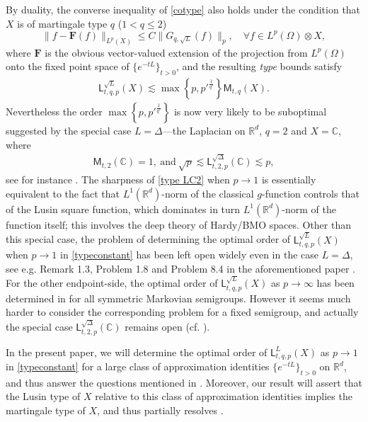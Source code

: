 \documentclass[oneside,english,a4wide]{amsart}
\numberwithin{equation}{section}
\numberwithin{figure}{section}
\theoremstyle{plain}
\theoremstyle{plain}
\theoremstyle{definition}
\theoremstyle{plain}
\theoremstyle{remark}
\theoremstyle{definition}
\theoremstyle{remark}
\theoremstyle{definition}
\newcommand{\8}{+\infty}
\renewcommand{\1}{\mathbbm{1}}
\newcommand\lk[1]{ \left\{ #1 \right\} }
\begin{document}
By duality, the converse inequality of \eqref{cotype} also holds under the condition that $X$ is of  {martingale type} $q$ ($1<q \leq2$)
$$\|f-\mathbf{F}(f) \|_{L^p(X)}\leq C\|G_{q,\sqrt{L}}(f)\|_{p},\quad\forall f\in L^p(\Omega)\otimes X,$$
where $ \mathbf{F} $ is the obvious vector-valued extension of the projection from $L^p(\Omega)$ onto the fixed point space of $\{e^{-tL}\}_{t > 0}$, and the resulting {\it type} bounds satisfy
\begin{align}\label{typeconstant}
\mathsf{L}^{\sqrt{L}}_{t,q, p}(X) \lesssim \max\lk{ p, p'^{\frac{1}{q'}} }\mathsf{M}_{t, q}(X).
\end{align}
Nevertheless the order $\max\lk{ p, p'^{\frac{1}{q'}}}$ is now very likely to be suboptimal suggested by the special case $L=\Delta$---the Laplacian on $\mathbb R^d$, $q=2$ and $X=\mathbb C$,  where 
\begin{align}\label{type LC2}\mathsf{M}_{t, 2}(\mathbb C)=1, \ \mathrm{and}\ \sqrt{p}\lesssim \mathsf{L}^{\sqrt{\Delta}}_{t,2, p}(\mathbb C) \lesssim p, \end{align}
see for instance \cite[Theorem 1]{Xu2022}. The sharpness of \eqref{type LC2} when $p\rightarrow 1$ is essentially equivalent to the fact that $L^1(\mathbb R^d)$-norm of the classical $g$-function controls that of the Lusin square function, which dominates in turn $L^1(\mathbb R^d)$-norm of the function itself; this involves the deep theory of Hardy/BMO spaces. Other than this special case, the problem of determining the optimal order of $\mathsf{L}^{\sqrt{L}}_{t, q, p}(X)$ when $p\rightarrow1$ in \eqref{typeconstant} has been left open widely even in the case $L=\Delta$, see e.g. Remark 1.3, Problem 1.8 and Problem 8.4 in the aforementioned paper \cite{Xu2021}. For the other endpoint-side, the optimal order of $\mathsf{L}^{\sqrt{L}}_{t,q, p}(X)$ as $p\rightarrow\infty$ has been determined in \cite{XZ2023} for all symmetric Markovian semigroups. However it seems much harder to consider the corresponding problem for a fixed semigroup, and actually the special case $\mathsf{L}^{\sqrt{\Delta}}_{t,2, p}(\mathbb C)$ remains open {(cf. \cite[Problem 5]{Xu2022})}. 

In the present paper, we will determine the optimal order of $\mathsf{L}^{{L}}_{t, q, p}(X)$ as $p\rightarrow1$ in \eqref{typeconstant} for a large class of approximation identities $\{e^{-tL}\}_{t>0}$ on $\mathbb R^d$, and thus answer the questions mentioned in \cite[Remark 1.3 and Problem 1.8]{Xu2021}. Moreover,  our result will assert that the Lusin type of $X$ relative to this class of approximation identities implies the martingale type of $X$, and thus partially resolves \cite[Problem A.1 and Conjecture A.4]{Xu2021}.
\end{document}
